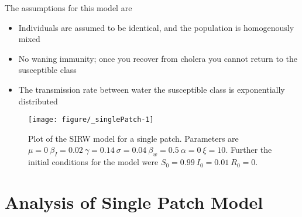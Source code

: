 \documentclass[12pt]{article}\usepackage[]{graphicx}\usepackage[]{color}
\makeatletter
\def\maxwidth{ %
  \ifdim\Gin@nat@width>\linewidth
    \linewidth
  \else
    \Gin@nat@width
  \fi
}
\newenvironment{kframe}{%
 \def\at@end@of@kframe{}%
 \ifinner\ifhmode%
  \def\at@end@of@kframe{\end{minipage}}%
  \begin{minipage}{\columnwidth}%
 \fi\fi%
 \def\FrameCommand##1{\hskip\@totalleftmargin \hskip-\fboxsep
 \colorbox{shadecolor}{##1}\hskip-\fboxsep
     \hskip-\linewidth \hskip-\@totalleftmargin \hskip\columnwidth}%
 \MakeFramed {\advance\hsize-\width
   \@totalleftmargin\z@ \linewidth\hsize
   \@setminipage}}%
 {\par\unskip\endMakeFramed%
 \at@end@of@kframe}
\newenvironment{knitrout}{}{} %
\makeatother
\begin{document}
The assumptions for this model are
\begin{itemize}
    \item Individuals are assumed to be identical, and the population is homogenously mixed
    \item No waning immunity; once you recover from cholera you cannot return to the susceptible class
    \item The transmission rate between water the susceptible class  is exponentially distributed
\end{itemize}

\begin{knitrout}
\color{fgcolor}\begin{kframe}


{\ttfamily\noindent\itshape\color{messagecolor}{\#\# Loading required package: rootSolve}}

{\ttfamily\noindent\itshape\color{messagecolor}{\#\# Loading required package: shape}}

{\ttfamily\noindent\itshape\color{messagecolor}{\#\# Loading required package: testthat}}

{\ttfamily\noindent\itshape\color{messagecolor}{\#\# Loading required package: gsw}}\end{kframe}\begin{figure}[h]
\texttt{[image: figure/\_singlePatch-1]} \caption{\label{fig:singlepatch} Plot of the SIRW model for a single patch. Parameters are $\mu=0\ \beta_I=0.02\ \gamma=0.14\ \sigma=0.04\ \beta_w=0.5\ \alpha=0\ \xi=10$. Further the initial conditions for the model were $S_0=0.99\ I_0=0.01\ R_0=0$.}\label{fig:<singlePatch}
\end{figure}


\end{knitrout}
\FloatBarrier
\section{Analysis of Single Patch Model}
\end{document}

